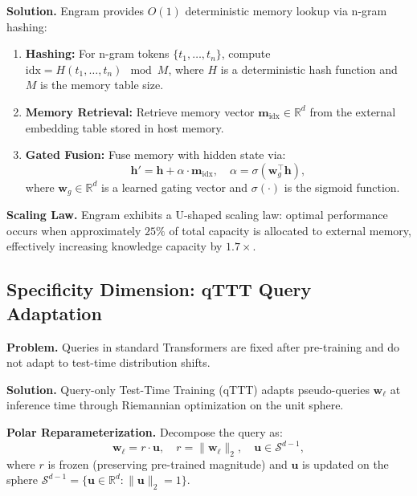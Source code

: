 \documentclass[twocolumn]{article}
\begin{document}
\textbf{Solution.} Engram \cite{engram} provides $O(1)$ deterministic memory lookup via n-gram hashing:
\begin{enumerate}[leftmargin=*]
    \item \textbf{Hashing:} For n-gram tokens $\{t_1, \dots, t_n\}$, compute $\mathrm{idx} = H(t_1, \dots, t_n) \mod M$, where $H$ is a deterministic hash function and $M$ is the memory table size.
    \item \textbf{Memory Retrieval:} Retrieve memory vector $\mathbf{m}_{\mathrm{idx}} \in \mathbb{R}^d$ from the external embedding table stored in host memory.
    \item \textbf{Gated Fusion:} Fuse memory with hidden state via:
    \begin{equation}
    \mathbf{h}' = \mathbf{h} + \alpha \cdot \mathbf{m}_{\mathrm{idx}}, \quad \alpha = \sigma(\mathbf{w}_g^\top \mathbf{h}),
    \end{equation}
    where $\mathbf{w}_g \in \mathbb{R}^d$ is a learned gating vector and $\sigma(\cdot)$ is the sigmoid function.
\end{enumerate}

\textbf{Scaling Law.} Engram exhibits a U-shaped scaling law: optimal performance occurs when approximately $25\%$ of total capacity is allocated to external memory, effectively increasing knowledge capacity by $1.7\times$.

\subsection{Specificity Dimension: qTTT Query Adaptation}
\label{sec:adn-qttt}

\textbf{Problem.} Queries in standard Transformers are fixed after pre-training and do not adapt to test-time distribution shifts.

\textbf{Solution.} Query-only Test-Time Training (qTTT) adapts pseudo-queries $\mathbf{w}_\ell$ at inference time through Riemannian optimization on the unit sphere.

\textbf{Polar Reparameterization.} Decompose the query as:
\begin{equation}
\mathbf{w}_\ell = r \cdot \mathbf{u}, \quad r = \|\mathbf{w}_\ell\|_2, \quad \mathbf{u} \in \mathcal{S}^{d-1},
\end{equation}
where $r$ is frozen (preserving pre-trained magnitude) and $\mathbf{u}$ is updated on the sphere $\mathcal{S}^{d-1} = \{\mathbf{u} \in \mathbb{R}^d : \|\mathbf{u}\|_2 = 1\}$.
\end{document}
